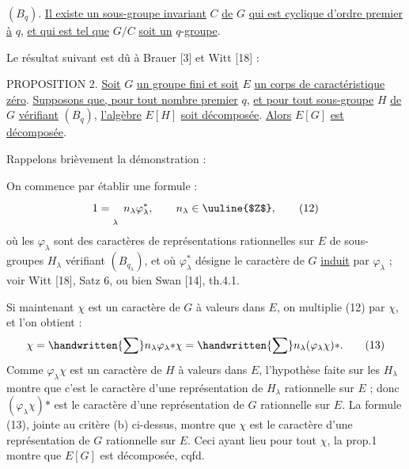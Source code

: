 $(B_q)$. \uline{Il existe un sous-groupe invariant} $C$ \uline{de} $G$ \uline{qui est cyclique d'ordre premier à} $q$, \uline{et qui est tel que} $G/C$ \uline{soit un} $q$-\uline{groupe}.

Le résultat suivant est dû à Brauer [3] et Witt [18] :

PROPOSITION 2. \uline{Soit} $G$ \uline{un groupe fini et soit} $E$ \uline{un corps de caractéristique zéro}. \uline{Supposons que, pour tout nombre premier} $q$, \uline{et pour tout sous-groupe} $H$ \uline{de} $G$ \uline{vérifiant} $(B_q)$, \uline{l'algèbre} $E[H]$ \uline{soit décomposée}. \uline{Alors} $E[G]$ \uline{est décomposée}.

Rappelons brièvement la démonstration :

On commence par établir une formule :
\[
\csname tagsleft@true\endcsname
1=\mathop{\vphantom{\sum}}\limits_{\lambda}\ n_\lambda\varphi_\lambda^*,\qquad n_\lambda\in\text{\uuline{$Z$}},\tag*{(12)}
\]
où les $\varphi_\lambda$ sont des caractères de représentations rationnelles sur $E$ de sous-groupes $H_\lambda$ vérifiant $(B_{q_\lambda})$, et où $\varphi_\lambda^*$ désigne le caractère de $G$ \uline{induit} par $\varphi_\lambda$ ; voir Witt [18], Satz 6, ou bien Swan [14], th.4.1.

Si maintenant $\chi$ est un caractère de $G$ à valeurs dans $E$, on multiplie (12) par $\chi$, et l'on obtient :
\[
\csname tagsleft@true\endcsname
\chi=\handwritten{\sum}n_\lambda\varphi_\lambda\mathord{*}\chi
=\handwritten{\sum}n_\lambda(\varphi_\lambda\chi)\mathord{*}.\tag*{(13)}
\]
Comme $\varphi_\lambda\chi$ est un caractère de $H$ à valeurs dans $E$, l'hypothèse faite sur les $H_\lambda$ montre que c'est le caractère d'une représentation de $H_\lambda$ rationnelle sur $E$ ; donc $(\varphi_\lambda\chi)\mathord{*}$ est le caractère d'une représentation de $G$ rationnelle sur $E$. La formule (13), jointe au critère (b) ci-dessus, montre que $\chi$ est le caractère d'une représentation de $G$ rationnelle sur $E$. Ceci ayant lieu pour tout $\chi$, la prop.1 montre que $E[G]$ est décomposée, cqfd.


